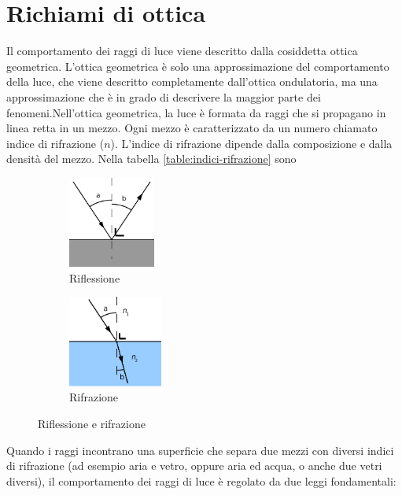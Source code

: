 \section{Richiami di ottica}

Il comportamento dei raggi di luce viene descritto dalla cosiddetta ottica
geometrica. L'ottica geometrica è solo una approssimazione del comportamento
della luce, che viene descritto completamente dall'ottica ondulatoria, ma una
approssimazione che è in grado di descrivere la maggior parte dei
fenomeni.Nell'ottica geometrica, la luce è formata da raggi che si propagano
in linea retta in un mezzo. Ogni mezzo è caratterizzato da un numero chiamato
indice di rifrazione ($n$). L'indice di rifrazione dipende dalla composizione
e dalla densità del mezzo. Nella tabella \ref{table:indici-rifrazione} sono



\begin{figure}[!ht]
\begin{subfigure}[t]{.5\textwidth}
\centering
\caption{Riflessione}
\label{sub:riflessione}
\includegraphics[height=3cm]{img/riflessione.pdf}

\end{subfigure}
\begin{subfigure}[t]{.5\textwidth}
\caption{Rifrazione}
\label{sub:rifrazione}
\centering
\includegraphics[height=3cm]{img/rifrazione.pdf}


\end{subfigure}
\caption{Riflessione e rifrazione}
\label{fig:riflessione-rifrazione}
\end{figure}


Quando i raggi incontrano una superficie che separa due mezzi con diversi
indici di rifrazione (ad esempio aria e vetro, oppure aria ed acqua, o anche
due vetri diversi), il comportamento dei raggi di luce è regolato da due leggi
fondamentali:

